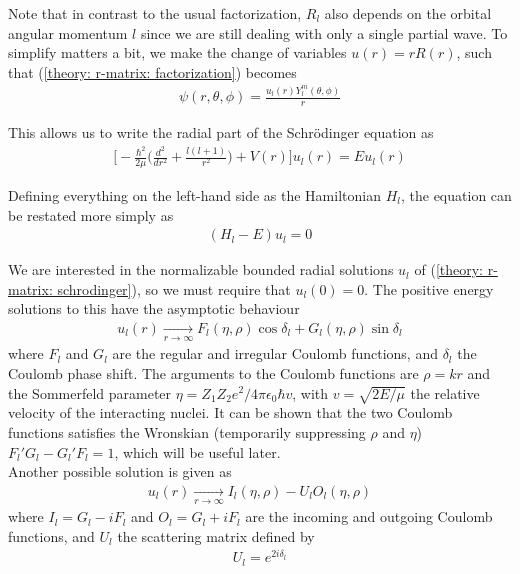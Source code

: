 Note that in contrast to the usual factorization, $R_l$ also depends on the orbital angular momentum $l$ since we are still dealing with only a single partial wave. To simplify matters a bit, we make the change of variables $u(r) = rR(r)$, such that (\ref{theory: r-matrix: factorization}) becomes
\begin{align*}
	\psi(r, \theta, \phi) = \frac{u_l(r) Y^m_l(\theta, \phi)}{r}
\end{align*}

This allows us to write the radial part of the Schrödinger equation as
\begin{align*}
	\bigg[-\frac{\hbar^2}{2\mu} \bigg(\frac{d^2}{dr^2} + \frac{l(l+1)}{r^2} \bigg) + V(r)\bigg]u_l(r) = Eu_l(r)	
\end{align*}

Defining everything on the left-hand side as the Hamiltonian $H_l$, the equation can be restated more simply as
\begin{align} \label{theory: r-matrix: schrodinger}
	(H_l - E)u_l = 0
\end{align}

We are interested in the normalizable bounded radial solutions $u_l$ of (\ref{theory: r-matrix: schrodinger}), so we must require that $u_l(0) = 0$. The positive energy solutions to this have the asymptotic behaviour 
\begin{align} \label{theory: r-matrix: solution 1}
	u_l(r) \xrightarrow[r\rightarrow \infty]{} F_l(\eta, \rho) \cos \delta_l  + G_l(\eta, \rho) \sin \delta_l 
\end{align}
where $F_l$ and $G_l$ are the regular and irregular Coulomb functions, and $\delta_l$ the Coulomb phase shift. The arguments to the Coulomb functions are $\rho = kr$ and the Sommerfeld parameter $\eta = Z_1 Z_2 e^2 / 4 \pi \epsilon_0 \hbar v$, with $v = \sqrt{2E/\mu}$ the relative velocity of the interacting nuclei. It can be shown that the two Coulomb functions satisfies the Wronskian (temporarily suppressing $\rho$ and $\eta$) $F_l' G_l - G_l' F_l = 1$, which will be useful later. \\

Another possible solution is given as
\begin{align} \label{theory: r-matrix: solution 2}
u_l(r) \xrightarrow[r\rightarrow \infty]{} I_l(\eta, \rho)  - U_l O_l(\eta, \rho) 
\end{align}
where $I_l = G_l - iF_l$ and $O_l = G_l + iF_l$ are the incoming and outgoing Coulomb functions, and $U_l$ the scattering matrix defined by 
\begin{align*}
	U_l = e^{2i\delta_l}
\end{align*}

